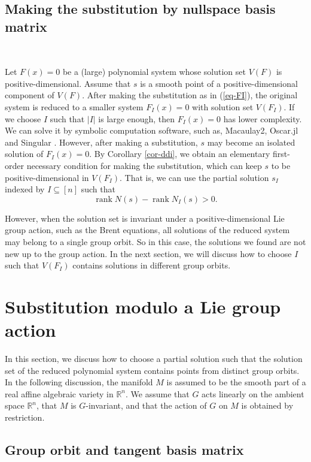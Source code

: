 \documentclass[reqno]{amsart}
\theoremstyle{definition}
\numberwithin{equation}{section}
\theoremstyle{remark}
\newcounter{condition}
\begin{document}
\subsection{Making the substitution by nullspace basis matrix} 
\label{subsec-first}
\

Let $F(x)=0$ be a (large) polynomial system whose solution set $V(F)$ is positive-dimensional. Assume that $s$ is a smooth point of a positive-dimensional component of $V(F)$. After making the substitution as in (\ref{eq-FI}), the original system is reduced to a smaller system $F_I(x)=0$ with solution set $V(F_I)$. If we choose $I$ such that $|I|$ is large enough, then $F_I(x)=0$ has lower complexity. We can solve it by symbolic computation software, such as, Macaulay2, Oscar.jl and Singular \cite{Dec25,Eis-M2book02,GreuelPf08}. However, after making a substitution, $s$ may become an isolated solution of $F_I(x)=0$. By Corollary \ref{cor-ddi}, we obtain an elementary first-order necessary condition for making the substitution, which can keep $s$ to be positive-dimensional in $V(F_I)$. That is, we can use the partial solution $s_I$ indexed by $I\subseteq [n]$ such that $$\operatorname{rank}N(s)-\operatorname{rank}N_I(s)>0.$$

However, when the solution set is invariant under a positive-dimensional Lie group action, such as the Brent equations\cite{Heule21,li25def}, all solutions of the reduced system may belong to a single group orbit. So in this case, the solutions we found are not new up to the group action. In the next section, we will discuss how to choose $I$ such that $V(F_I)$ contains solutions in different group orbits.

\section{Substitution modulo a Lie group action}
\label{sec-subslg}
In this section, we discuss how to choose a partial solution such
that the solution set of the reduced polynomial system contains
points from distinct group orbits. In the following discussion, the
manifold $M$ is assumed to be the smooth part of a real affine algebraic
variety in $\mathbb{R}^n$. We assume that $G$ acts linearly on the ambient space $\mathbb{R}^n$, that $M$ is $G$-invariant, and that the action of
$G$ on $M$ is obtained by restriction.
\subsection{Group orbit and tangent basis matrix} 
\
\end{document}

